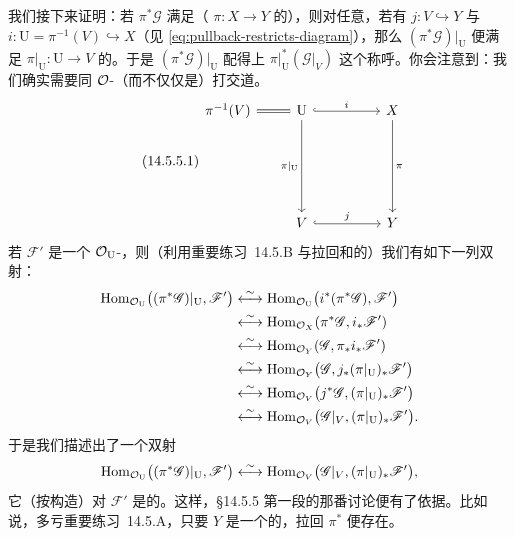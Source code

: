 我们接下来证明：若 $\pi^*\mathscr{G}$ 满足（\trMorphism{} $\pi\colon X\to Y$ 的）\trUniversalProperty，则对任意\trOpenSubset{}，若有 $j\colon V\hookrightarrow Y$ 与 $i\colon\mathrm{U}=\pi^{-1}(V)\hookrightarrow X$（见 \eqref{eq:pullback-restricts-diagram}），那么 $(\pi^*\mathscr{G})\vert_{\mathrm{U}}$ 便满足 $\pi\vert_{\mathrm{U}}\colon\mathrm{U}\to V$ 的\trUniversalProperty。于是 $(\pi^*\mathscr{G})\vert_{\mathrm{U}}$ 配得上 $\pi\vert_{\mathrm{U}}^*(\mathscr{G}\vert_V)$ 这个称呼。你会注意到：我们确实需要同 $\mathcal{O}$-\trModule（而不仅仅是\trQCSheaf）打交道。
\begin{equation*}\tag{14.5.5.1}\label{eq:pullback-restricts-diagram}
\begin{tikzcd}[row sep=3.2em]
\pi^{-1}(V) \ar[r, equal] & \mathrm{U} \ar[rr, hook, "i"] \ar[dd, "\pi\vert_{\mathrm{U}}"'] && X \ar[dd, "\pi"] \\
\\
& V \ar[rr, hook, "j"] && Y
\end{tikzcd}
\end{equation*}
若 $\mathscr{F}'$ 是一个 $\mathcal{O}_{\mathrm{U}}$-\trModule，则（利用重要练习~14.5.B 与拉回和\trPushforward{}的\trAdjointness）我们有如下一列双射：
\[
\begin{aligned}
\operatorname{Hom}_{\mathcal{O}_{\mathrm{U}}}\bigl((\pi^*\mathscr{G})\vert_{\mathrm{U}},\mathscr{F}'\bigr)
  &\overset{\sim}{\longleftrightarrow}\operatorname{Hom}_{\mathcal{O}_{\mathrm{U}}}\bigl(i^*(\pi^*\mathscr{G}),\mathscr{F}'\bigr)\\
  &\overset{\sim}{\longleftrightarrow}\operatorname{Hom}_{\mathcal{O}_X}(\pi^*\mathscr{G},i_*\mathscr{F}')\\
  &\overset{\sim}{\longleftrightarrow}\operatorname{Hom}_{\mathcal{O}_Y}(\mathscr{G},\pi_*i_*\mathscr{F}')\\
  &\overset{\sim}{\longleftrightarrow}\operatorname{Hom}_{\mathcal{O}_Y}\bigl(\mathscr{G},j_*(\pi\vert_{\mathrm{U}})_*\mathscr{F}'\bigr)\\
  &\overset{\sim}{\longleftrightarrow}\operatorname{Hom}_{\mathcal{O}_V}\bigl(j^*\mathscr{G},(\pi\vert_{\mathrm{U}})_*\mathscr{F}'\bigr)\\
  &\overset{\sim}{\longleftrightarrow}\operatorname{Hom}_{\mathcal{O}_V}\bigl(\mathscr{G}\vert_V,(\pi\vert_{\mathrm{U}})_*\mathscr{F}'\bigr).
\end{aligned}
\]
于是我们描述出了一个双射
\[
\operatorname{Hom}_{\mathcal{O}_{\mathrm{U}}}\bigl((\pi^*\mathscr{G})\vert_{\mathrm{U}},\mathscr{F}'\bigr)\overset{\sim}{\longleftrightarrow}\operatorname{Hom}_{\mathcal{O}_V}\bigl(\mathscr{G}\vert_V,(\pi\vert_{\mathrm{U}})_*\mathscr{F}'\bigr),
\]
它（按构造）对 $\mathscr{F}'$ 是\trFunctoriality{}的。这样，\S14.5.5 第一段的那番讨论便有了依据。比如说，多亏重要练习~14.5.A，只要 $Y$ 是一个\trAffine\trScheme{}的\trOpenSubset，拉回 $\pi^*$ 便存在。

